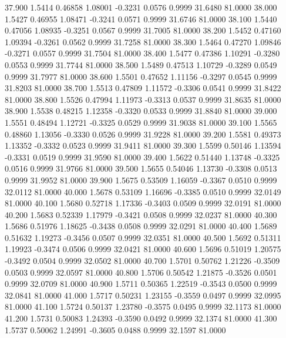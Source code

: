  37.900   1.5414   0.46858   1.08001  -0.3231   0.0576   0.9999  31.6480  81.0000
  38.000   1.5427   0.46955   1.08471  -0.3241   0.0571   0.9999  31.6746  81.0000
  38.100   1.5440   0.47056   1.08935  -0.3251   0.0567   0.9999  31.7005  81.0000
  38.200   1.5452   0.47160   1.09394  -0.3261   0.0562   0.9999  31.7258  81.0000
  38.300   1.5464   0.47270   1.09846  -0.3271   0.0557   0.9999  31.7504  81.0000
  38.400   1.5477   0.47386   1.10291  -0.3280   0.0553   0.9999  31.7744  81.0000
  38.500   1.5489   0.47513   1.10729  -0.3289   0.0549   0.9999  31.7977  81.0000
  38.600   1.5501   0.47652   1.11156  -0.3297   0.0545   0.9999  31.8203  81.0000
  38.700   1.5513   0.47809   1.11572  -0.3306   0.0541   0.9999  31.8422  81.0000
  38.800   1.5526   0.47994   1.11973  -0.3313   0.0537   0.9999  31.8635  81.0000
  38.900   1.5538   0.48215   1.12358  -0.3320   0.0533   0.9999  31.8840  81.0000
  39.000   1.5551   0.48494   1.12721  -0.3325   0.0529   0.9999  31.9038  81.0000
  39.100   1.5565   0.48860   1.13056  -0.3330   0.0526   0.9999  31.9228  81.0000
  39.200   1.5581   0.49373   1.13352  -0.3332   0.0523   0.9999  31.9411  81.0000
  39.300   1.5599   0.50146   1.13594  -0.3331   0.0519   0.9999  31.9590  81.0000
  39.400   1.5622   0.51440   1.13748  -0.3325   0.0516   0.9999  31.9766  81.0000
  39.500   1.5655   0.54046   1.13730  -0.3308   0.0513   0.9999  31.9952  81.0000
  39.900   1.5675   0.53509   1.16059  -0.3367   0.0510   0.9999  32.0112  81.0000
  40.000   1.5678   0.53109   1.16696  -0.3385   0.0510   0.9999  32.0149  81.0000
  40.100   1.5680   0.52718   1.17336  -0.3403   0.0509   0.9999  32.0191  81.0000
  40.200   1.5683   0.52339   1.17979  -0.3421   0.0508   0.9999  32.0237  81.0000
  40.300   1.5686   0.51976   1.18625  -0.3438   0.0508   0.9999  32.0291  81.0000
  40.400   1.5689   0.51632   1.19273  -0.3456   0.0507   0.9999  32.0351  81.0000
  40.500   1.5692   0.51311   1.19923  -0.3474   0.0506   0.9999  32.0421  81.0000
  40.600   1.5696   0.51019   1.20575  -0.3492   0.0504   0.9999  32.0502  81.0000
  40.700   1.5701   0.50762   1.21226  -0.3509   0.0503   0.9999  32.0597  81.0000
  40.800   1.5706   0.50542   1.21875  -0.3526   0.0501   0.9999  32.0709  81.0000
  40.900   1.5711   0.50365   1.22519  -0.3543   0.0500   0.9999  32.0841  81.0000
  41.000   1.5717   0.50231   1.23155  -0.3559   0.0497   0.9999  32.0995  81.0000
  41.100   1.5724   0.50137   1.23780  -0.3575   0.0495   0.9999  32.1173  81.0000
  41.200   1.5731   0.50083   1.24393  -0.3590   0.0492   0.9999  32.1374  81.0000
  41.300   1.5737   0.50062   1.24991  -0.3605   0.0488   0.9999  32.1597  81.0000
